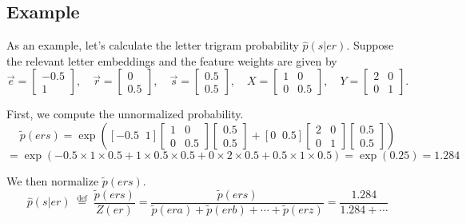 \subsection*{Example}
As an example, let’s calculate the letter trigram probability $\hat{p}(s|er)$. Suppose the relevant letter embeddings and the feature weights are given by
\[
\vec{e} = \begin{bmatrix}-0.5 \\ 1 \end{bmatrix}, \quad 
\vec{r} = \begin{bmatrix} 0 \\ 0.5 \end{bmatrix}, \quad
\vec{s} = \begin{bmatrix} 0.5 \\ 0.5 \end{bmatrix}, \quad
X = \begin{bmatrix} 1 & 0 \\ 0 & 0.5 \end{bmatrix}, \quad
Y = \begin{bmatrix} 2 & 0 \\ 0 & 1 \end{bmatrix}.
\]

First, we compute the unnormalized probability.
\[
\tilde{p}(ers) = \exp \left( [-0.5 \;\; 1] 
\begin{bmatrix} 1 & 0 \\ 0 & 0.5 \end{bmatrix} 
\begin{bmatrix} 0.5 \\ 0.5 \end{bmatrix}
+ [0 \;\; 0.5] 
\begin{bmatrix} 2 & 0 \\ 0 & 1 \end{bmatrix} 
\begin{bmatrix} 0.5 \\ 0.5 \end{bmatrix} \right)
\]
\[
= \exp(-0.5 \times 1 \times 0.5 + 1 \times 0.5 \times 0.5 + 0 \times 2 \times 0.5 + 0.5 \times 1 \times 0.5) = \exp(0.25) = 1.284
\]

We then normalize $\tilde{p}(ers)$.
\[
\hat{p}(s|er) \;\stackrel{\text{def}}{=}\; \frac{\tilde{p}(ers)}{Z(er)} = \frac{\tilde{p}(ers)}{\tilde{p}(era) + \tilde{p}(erb) + \cdots + \tilde{p}(erz)} = \frac{1.284}{1.284 + \cdots}
\tag{12}
\]

